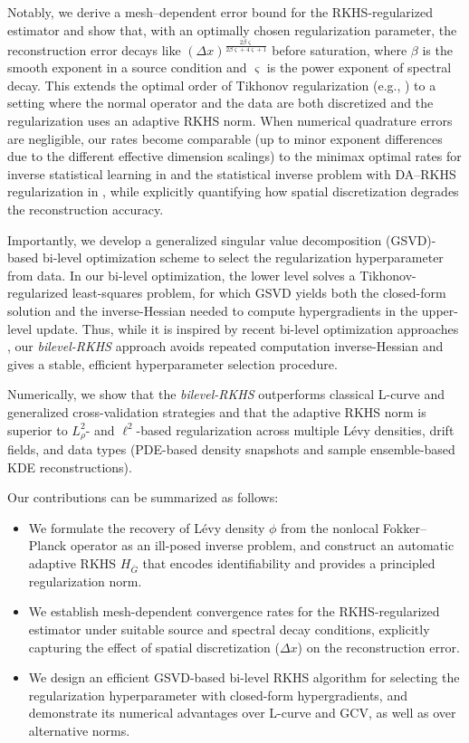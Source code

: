 \documentclass[12pt]{article}
\def\Gbar{ {\overline{G}} }
\numberwithin{equation}{section}
\numberwithin{theorem}{section}
\begin{document}
Notably, we derive a mesh–dependent error bound for the RKHS‑regularized estimator and show that, with an optimally chosen regularization parameter, the reconstruction error decays like $(\Delta x)^{\frac{2\beta \varsigma}{2\beta \varsigma+4\varsigma+1}}$ before saturation, where $\beta$ is the smooth exponent in a source condition and $\varsigma$ is the power exponent of spectral decay. This extends the optimal order of Tikhonov regularization (e.g., \cite[Sec.~3.2]{engl1996regularization}) to a setting where the normal operator and the data are both discretized and the regularization uses an adaptive RKHS norm. When numerical quadrature errors are negligible, our rates become comparable (up to minor exponent differences due to the different effective dimension scalings) to the minimax optimal rates for inverse statistical learning in \cite{blanchard2018optimal} and the statistical inverse problem with DA–RKHS regularization in \cite{zhang2025minimax}, while explicitly quantifying how spatial discretization degrades the reconstruction accuracy.


Importantly, we develop a generalized singular value decomposition (GSVD)-based bi-level optimization scheme to select the regularization hyperparameter from data. In our bi-level optimization, the lower level solves a Tikhonov-regularized least-squares problem, for which GSVD yields both the closed-form solution and the inverse-Hessian needed to compute hypergradients in the upper-level update. Thus, while it is inspired by recent bi-level optimization approaches \cite{nelsen2025bilevel,chada2022consistency}, our \emph{bilevel-RKHS} approach avoids repeated computation inverse-Hessian and gives a stable, efficient hyperparameter selection procedure. 

Numerically, we show that the \emph{bilevel-RKHS} outperforms classical L-curve \cite{hansen1992analysis} and generalized cross-validation \cite{golub1979generalized} strategies and that the adaptive RKHS norm is superior to $L^2_\rho$- and $\ell^2$-based regularization across multiple L\'evy densities, drift fields, and data types (PDE-based density snapshots and sample ensemble-based KDE reconstructions).

Our contributions can be summarized as follows:
\begin{itemize}
    \item We formulate the recovery of L\'evy density $\phi$ from the nonlocal Fokker–Planck operator as an ill-posed inverse problem, and construct an automatic adaptive RKHS $H_{\Gbar}$ that encodes identifiability and provides a principled regularization norm.
    \item We establish mesh-dependent convergence rates for the RKHS-regularized estimator under suitable source and spectral decay conditions, explicitly capturing the effect of spatial discretization ($\Delta x$) on the reconstruction error.
    \item We design an efficient GSVD-based bi-level RKHS algorithm for selecting the regularization hyperparameter with closed-form hypergradients, and demonstrate its numerical advantages over L-curve and GCV, as well as over alternative norms.
\end{itemize}
\end{document}

